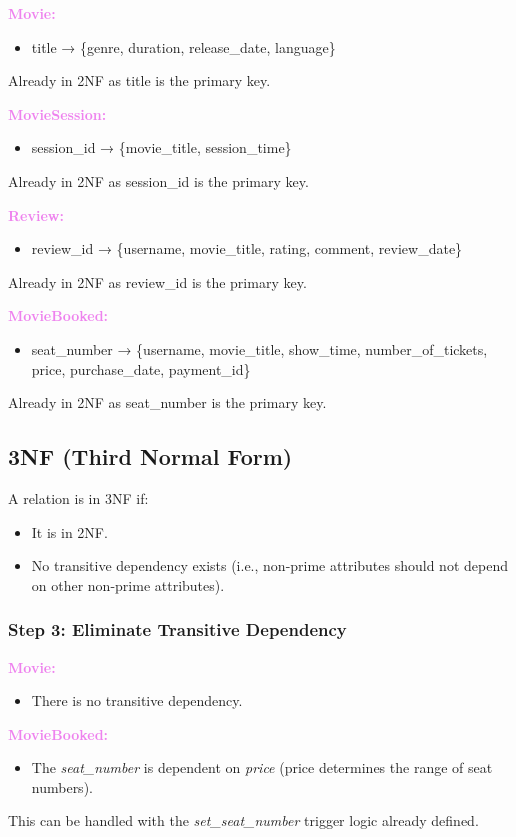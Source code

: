 \documentclass[a4paper,12pt]{article}  %
\renewcommand{\textbf}[1]{\textcolor{violet}{\bfseries #1}}
\begin{document}
\textbf{Movie:}
\begin{itemize}
    \item title → \{genre, duration, release\_date, language\}
\end{itemize}
Already in 2NF as title is the primary key.

\textbf{MovieSession:}
\begin{itemize}
    \item session\_id → \{movie\_title, session\_time\}
\end{itemize}
Already in 2NF as session\_id is the primary key.

\textbf{Review:}
\begin{itemize}
    \item review\_id → \{username, movie\_title, rating, comment, review\_date\}
\end{itemize}
Already in 2NF as review\_id is the primary key.

\textbf{MovieBooked:}
\begin{itemize}
    \item seat\_number → \{username, movie\_title, show\_time, number\_of\_tickets, price, purchase\_date, payment\_id\}
\end{itemize}
Already in 2NF as seat\_number is the primary key.

\subsection{3NF (Third Normal Form)}

A relation is in 3NF if:
\begin{itemize}
    \item It is in 2NF.
    \item No transitive dependency exists (i.e., non-prime attributes should not depend on other non-prime attributes).
\end{itemize}

\subsubsection*{Step 3: Eliminate Transitive Dependency}

\textbf{Movie:} 
\begin{itemize}
    \item There is no transitive dependency.
\end{itemize}

\textbf{MovieBooked:}
\begin{itemize}
    \item The \textit{seat\_number} is dependent on \textit{price} (price determines the range of seat numbers).
\end{itemize}
This can be handled with the \textit{set\_seat\_number} trigger logic already defined.
\end{document}
